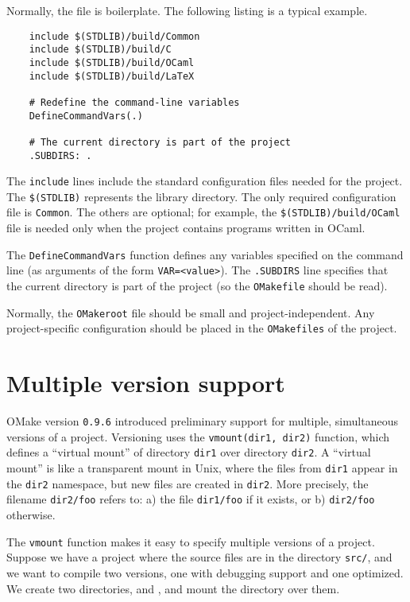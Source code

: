 Normally, the  file is boilerplate.  The following listing is a typical example.

\begin{verbatim}
    include $(STDLIB)/build/Common
    include $(STDLIB)/build/C
    include $(STDLIB)/build/OCaml
    include $(STDLIB)/build/LaTeX

    # Redefine the command-line variables
    DefineCommandVars(.)

    # The current directory is part of the project
    .SUBDIRS: .
\end{verbatim}

The \verb+include+ lines include the standard configuration files needed for the project.  The
\verb+$(STDLIB)+ represents the  library directory.  The only required configuration
file is \verb+Common+.  The others are optional; for example, the \verb+$(STDLIB)/build/OCaml+ file
is needed only when the project contains programs written in OCaml.

The \verb+DefineCommandVars+ function defines any variables specified on the command line (as
arguments of the form \verb+VAR=<value>+).  The \verb+.SUBDIRS+ line specifies that the current
directory is part of the project (so the \verb+OMakefile+ should be read).

Normally, the \verb+OMakeroot+ file should be small and project-independent.  Any project-specific
configuration should be placed in the \verb+OMakefiles+ of the project.

\section{Multiple version support}

OMake version \verb+0.9.6+ introduced preliminary support for multiple, simultaneous versions of a
project.  Versioning uses the \verb+vmount(dir1, dir2)+ function, which defines a ``virtual mount''
of directory \verb+dir1+ over directory \verb+dir2+.  A ``virtual mount'' is like a transparent
mount in Unix, where the files from \verb+dir1+ appear in the \verb+dir2+ namespace, but new files
are created in \verb+dir2+.  More precisely, the filename \verb+dir2/foo+ refers to: a) the file
\verb+dir1/foo+ if it exists, or b) \verb+dir2/foo+ otherwise.

The \verb+vmount+ function makes it easy to specify multiple versions of a project.  Suppose we have
a project where the source files are in the directory \verb+src/+, and we want to compile two
versions, one with debugging support and one optimized.  We create two directories,  and
, and mount the  directory over them.


